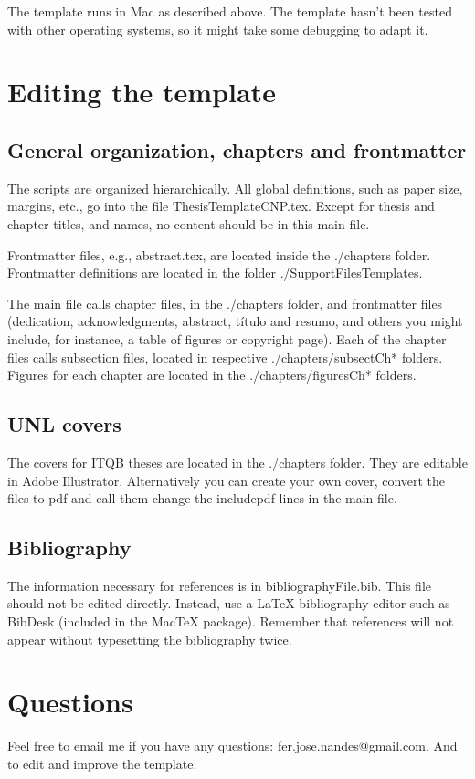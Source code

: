 \documentclass[11pt]{article} %
\begin{document}
The template runs in Mac as described above. The template hasn't been tested with other operating systems, so it might take some debugging to adapt it. 

\section{Editing the template}

\subsection{General organization, chapters and frontmatter}

The scripts are organized hierarchically. All global definitions, such as paper size, margins, etc., go into the file ThesisTemplateCNP.tex. Except for thesis and chapter titles, and names, no content should be in this main file.

Frontmatter files, e.g., abstract.tex, are located inside the ./chapters folder. Frontmatter definitions are located in the folder ./SupportFilesTemplates.

The main file calls chapter files, in the ./chapters folder, and frontmatter files (dedication, acknowledgments, abstract, t\'{i}tulo and resumo, and others you might include, for instance, a table of figures or copyright page). Each of the chapter files calls subsection files, located in respective ./chapters/subsectCh* folders. Figures for each chapter are located in the ./chapters/figuresCh* folders.

\subsection{UNL covers}

The covers for ITQB theses are located in the ./chapters folder. They are editable in Adobe Illustrator. Alternatively you can create your own cover, convert the files to pdf and call them change the includepdf lines in the main file. 

\subsection{Bibliography}

The information necessary for references is in bibliographyFile.bib. This file should not be edited directly. Instead, use a LaTeX bibliography editor such as BibDesk (included in the MacTeX package). Remember that references will not appear without typesetting the bibliography twice. 

\section{Questions}

Feel free to email me if you have any questions: fer.jose.nandes@gmail.com. And to edit and improve the template.
\end{document}
